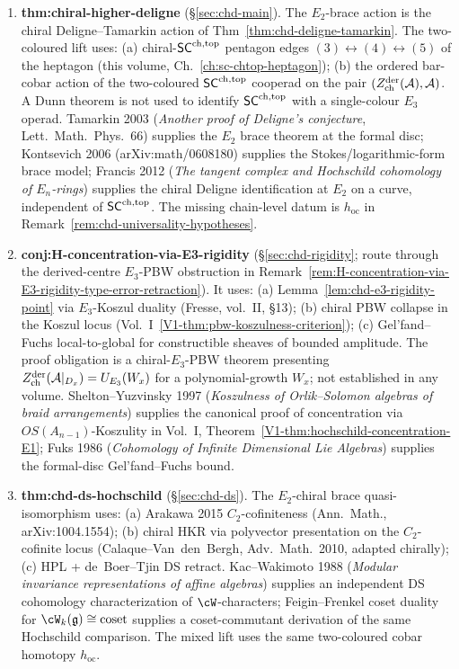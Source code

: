 \begin{enumerate}
\item \textbf{thm:chiral-higher-deligne} (\S\ref{sec:chd-main}).
The $E_2$-brace action is the chiral Deligne--Tamarkin action of
Thm~\ref{thm:chd-deligne-tamarkin}. The two-coloured lift uses:
(a) chiral-$\mathsf{SC}^{\mathrm{ch},\mathrm{top}}$ pentagon edges
$(3)\leftrightarrow(4)\leftrightarrow(5)$ of the heptagon
(this volume, Ch.~\ref{ch:sc-chtop-heptagon}); (b) the ordered
bar-cobar action of the two-coloured $\mathsf{SC}^{\mathrm{ch},\mathrm{top}}$ cooperad on the pair
$(Z^{\mathrm{der}}_{\mathrm{ch}}(\mathcal{A}),\mathcal{A})$. A Dunn theorem is not
used to identify $\mathsf{SC}^{\mathrm{ch},\mathrm{top}}$ with a single-colour $E_3$ operad.
Tamarkin 2003 (\emph{Another proof of Deligne's conjecture},
Lett.~Math.~Phys.\ 66) supplies the $E_2$ brace theorem at the formal
disc; Kontsevich 2006 (arXiv:math/0608180) supplies the
Stokes/logarithmic-form brace model; Francis 2012
(\emph{The tangent complex and Hochschild cohomology of $E_n$-rings})
supplies the chiral Deligne identification at $E_2$ on a curve,
independent of $\mathsf{SC}^{\mathrm{ch},\mathrm{top}}$. The missing chain-level datum is
$h_{\mathrm{oc}}$ in Remark~\ref{rem:chd-universality-hypotheses}.

\item \textbf{conj:H-concentration-via-E3-rigidity}
(\S\ref{sec:chd-rigidity}; route through the derived-centre
$E_3$-PBW obstruction in
Remark~\ref{rem:H-concentration-via-E3-rigidity-type-error-retraction}).
It uses: (a) Lemma~\ref{lem:chd-e3-rigidity-point} via
$E_3$-Koszul duality (Fresse, vol.~II, \S13); (b) chiral PBW
collapse in the Koszul locus
(Vol.~I~\ref*{V1-thm:pbw-koszulness-criterion}); (c) Gel'fand--Fuchs
local-to-global for constructible sheaves of bounded amplitude.
The proof obligation is a chiral-$E_3$-PBW theorem presenting
$Z^{\mathrm{der}}_{\mathrm{ch}}(\mathcal{A}|_{D_x}) = U_{E_3}(W_x)$ for a
polynomial-growth $W_x$; not established in any volume.
Shelton--Yuzvinsky 1997 (\emph{Koszulness of Orlik--Solomon algebras
of braid arrangements}) supplies the canonical proof of concentration
via $OS(A_{n-1})$-Koszulity in Vol.~I,
Theorem~\ref*{V1-thm:hochschild-concentration-E1}; Fuks 1986
(\emph{Cohomology of Infinite Dimensional Lie Algebras}) supplies the
formal-disc Gel'fand--Fuchs bound.

\item \textbf{thm:chd-ds-hochschild} (\S\ref{sec:chd-ds}).
The $E_2$-chiral brace quasi-isomorphism uses:
(a) Arakawa 2015 $C_2$-cofiniteness
(Ann.\ Math., arXiv:1004.1554); (b) chiral HKR via polyvector
presentation on the $C_2$-cofinite locus (Calaque--Van~den~Bergh,
Adv.~Math.\ 2010, adapted chirally); (c) HPL + de~Boer--Tjin DS retract.
Kac--Wakimoto 1988 (\emph{Modular invariance representations of affine
algebras}) supplies an independent DS cohomology characterization of
$\cW$-characters; Feigin--Frenkel coset duality for
$\cW_k(\fg) \cong \mathrm{coset}$ supplies a coset-commutant derivation
of the same Hochschild comparison. The mixed lift uses the same
two-coloured cobar homotopy $h_{\mathrm{oc}}$.
\end{enumerate}

